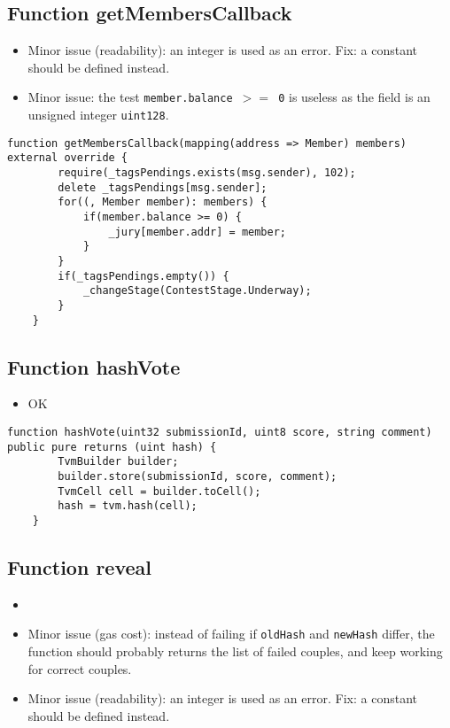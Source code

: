 \subsection{Function getMembersCallback}

\begin{itemize}
\item Minor issue (readability): an integer is used as an error. Fix:
  a constant should be defined instead.
\item Minor issue: the test {\tt member.balance $>=$ 0} is useless as
  the field is an unsigned integer {\tt uint128}.
\end{itemize}

\begin{lstlisting}[firstnumber=87]
    function getMembersCallback(mapping(address => Member) members) external override {
        require(_tagsPendings.exists(msg.sender), 102);
        delete _tagsPendings[msg.sender];
        for((, Member member): members) {
            if(member.balance >= 0) {
                _jury[member.addr] = member;
            }
        }
        if(_tagsPendings.empty()) {
            _changeStage(ContestStage.Underway);
        }
    }
\end{lstlisting}

\subsection{Function hashVote}

\begin{itemize}
\item OK
\end{itemize}

\begin{lstlisting}[firstnumber=223]
    function hashVote(uint32 submissionId, uint8 score, string comment) public pure returns (uint hash) {
        TvmBuilder builder;
        builder.store(submissionId, score, comment);
        TvmCell cell = builder.toCell();
        hash = tvm.hash(cell);
    }
\end{lstlisting}

\subsection{Function reveal}

\begin{itemize}
\item {}
\item Minor issue (gas cost): instead of failing if {\tt oldHash} and
  {\tt newHash} differ, the function should probably returns the list
  of failed couples, and keep working for correct couples.
\item Minor issue (readability): an integer is used as an error. Fix:
  a constant should be defined instead.
\end{itemize}

